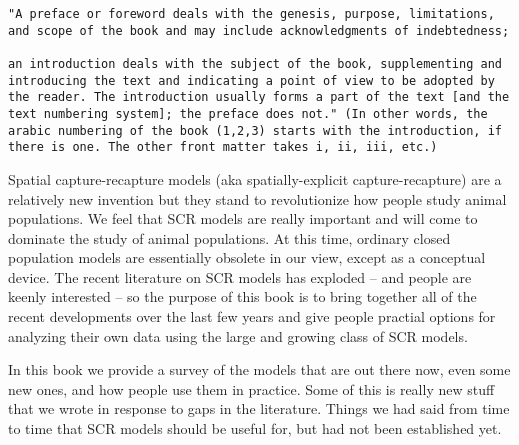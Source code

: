 \begin{verbatim}
"A preface or foreword deals with the genesis, purpose, limitations,
and scope of the book and may include acknowledgments of indebtedness;

an introduction deals with the subject of the book, supplementing and
introducing the text and indicating a point of view to be adopted by
the reader. The introduction usually forms a part of the text [and the
text numbering system]; the preface does not." (In other words, the
arabic numbering of the book (1,2,3) starts with the introduction, if
there is one. The other front matter takes i, ii, iii, etc.)
\end{verbatim}


Spatial capture-recapture models (aka spatially-explicit
capture-recapture) are a relatively new invention but they stand to
revolutionize how people study animal populations. We feel that SCR
models are really important and will come to dominate the study of
animal populations.
At this time, ordinary closed population models are essentially
obsolete in our view, except as a conceptual device. The recent
literature on SCR models has exploded -- and people are keenly
interested -- so the purpose of this book is to bring together all of
the recent developments over the last few years and give people
practial options for analyzing their own data using the large and
growing class of SCR models.

In this book we provide a survey of the models that are out there now,
even some new ones, and how people use them in practice. Some of this
is really new stuff that we wrote in response to gaps in the
literature. Things we had said from time to time that SCR models
should be useful for, but had not been established yet.

